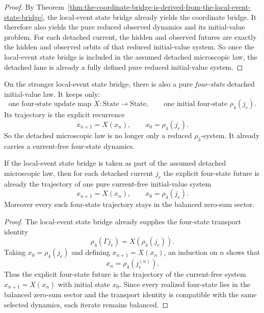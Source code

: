 \begin{proof}
By Theorem~\ref{thm:the-coordinate-bridge-is-derived-from-the-local-event-state-bridge},
the local-event state bridge already yields the coordinate bridge. It therefore
also yields the pure reduced observed dynamics and its initial-value problem.
For each detached current, the hidden and observed futures are exactly the
hidden and observed orbits of that reduced initial-value system.
So once the local-event state bridge is included in the assumed detached
microscopic law, the detached lane is already a fully defined pure reduced
initial-value system.
\end{proof}

\begin{definition}
\label{def:pure-four-state-detached-initial-value-law}
On the stronger local-event state bridge, there is also a pure
\emph{four-state} detached initial-value law. It keeps only:
\[
\text{one four-state update map }X : \mathrm{State}\to\mathrm{State},
\qquad
\text{one initial four-state } \rho_4(j_e).
\]
Its trajectory is the explicit recurrence
\[
x_{n+1}=X(x_n),
\qquad
x_0=\rho_4(j_e).
\]
So the detached microscopic law is no longer only a reduced
\(\rho_3\)-system. It already carries a current-free four-state dynamics.
\end{definition}

\begin{theorem}
\label{thm:the-local-event-state-bridge-already-determines-a-pure-four-state-law}
If the local-event state bridge is taken as part of the assumed detached
microscopic law, then for each detached current \(j_e\) the explicit
four-state future is already the trajectory of one pure current-free
initial-value system
\[
x_{n+1}=X(x_n),
\qquad
x_0=\rho_4(j_e).
\]
Moreover every such four-state trajectory stays in the balanced zero-sum
sector.
\end{theorem}

\begin{proof}
The local-event state bridge already supplies the four-state transport identity
\[
\rho_4(\Gamma j_e)=X(\rho_4(j_e)).
\]
Taking \(x_0=\rho_4(j_e)\) and defining \(x_{n+1}=X(x_n)\), an induction on
\(n\) shows that
\[
x_n=\rho_4(j_e^{(n)}).
\]
Thus the explicit four-state future is the trajectory of the current-free
system \(x_{n+1}=X(x_n)\) with initial state \(x_0\). Since every realized
four-state lies in the balanced zero-sum sector and the transport identity is
compatible with the same selected dynamics, each iterate remains balanced.
\end{proof}

